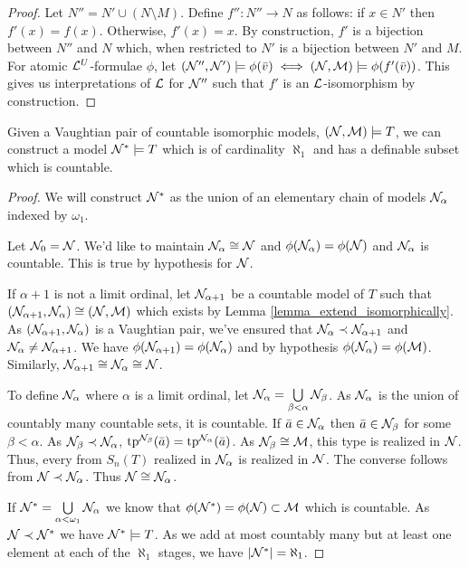 \begin{proof}
Let \(N'' = N' \cup (N \setminus M)\).
Define \(f'': N'' \to N\) as follows: if \(x \in N'\) then \(f'(x) = f(x)\). 
Otherwise, \(f'(x) = x\). 
By construction, \(f'\) is a bijection between \(N''\) and \(N\) which, when restricted to \(N'\) is a bijection between  \(N'\) and \(M\). 
For atomic \(\mathcal{L}^U\)-formulae \(\phi\), let \((\mathcal{N}'', \mathcal{N}') \models \phi(\bar{v}) \iff (\mathcal{N}, \mathcal{M}) \models \phi(f'(\bar{v}))\).
This gives us interpretations of \(\mathcal{L}\) for \(\mathcal{N}''\) such that \(f'\) is an \(\mathcal{L}\)-isomorphism by construction. 
\end{proof}

\begin{theorem}\label{theorem_aleph_one_vaughtian_pair}
Given a Vaughtian pair of countable isomorphic models, \((\mathcal{N}, \mathcal{M}) \models T\), we can construct a model \(\mathcal{N}^* \models T\) which is of cardinality \(\aleph_1\) and has a definable subset which is countable.  
\end{theorem}

\begin{proof}
We will construct \(\mathcal{N}^*\) as the union of an elementary chain of models \(\mathcal{N}_\alpha\) indexed by \(\omega_1\).

Let \(\mathcal{N}_0 = \mathcal{N}\). 
We'd like to maintain \(\mathcal{N}_\alpha \cong \mathcal{N}\) and \(\phi(\mathcal{N}_\alpha) = \phi(\mathcal{N})\) and \(\mathcal{N}_\alpha\) is countable. 
This is true by hypothesis for \(\mathcal{N}\).

If \(\alpha + 1\) is not a limit ordinal, let \(\mathcal{N}_{\alpha + 1}\) be a countable model of \(T\) such that \((\mathcal{N}_{\alpha+1}, \mathcal{N}_\alpha) \cong (\mathcal{N}, \mathcal{M})\) which exists by Lemma \ref{lemma_extend_isomorphically}. 
As \((\mathcal{N}_{\alpha+1}, \mathcal{N}_\alpha)\) is a Vaughtian pair, we've ensured that \(\mathcal{N}_\alpha \prec \mathcal{N}_{\alpha+1}\) and \(\mathcal{N}_\alpha \neq \mathcal{N}_{\alpha+1}\).
We have \(\phi(\mathcal{N}_{\alpha + 1}) = \phi(\mathcal{N}_\alpha)\) and by hypothesis \(\phi(\mathcal{N}_\alpha) = \phi(\mathcal{M})\). 
Similarly,  \(\mathcal{N}_{\alpha+1} \cong \mathcal{N}_\alpha \cong \mathcal{N}\). 

To define \(\mathcal{N}_\alpha\) where \(\alpha\) is a limit ordinal, let \(\mathcal{N}_\alpha = \bigcup\limits_{\beta < \alpha}\mathcal{N}_\beta\). 
As \(\mathcal{N}_\alpha\) is the union of countably many countable sets, it is countable. 
If \(\bar{a} \in \mathcal{N}_\alpha\) then \(\bar{a} \in \mathcal{N}_\beta\) for some \(\beta < \alpha\). 
As \(\mathcal{N}_\beta \prec \mathcal{N}_\alpha\), \(\text{tp}^{\mathcal{N}_\beta}(\bar{a}) = \text{tp}^{\mathcal{N}_\alpha}(\bar{a})\). 
As \(\mathcal{N}_\beta \cong \mathcal{M}\), this type is realized in \(\mathcal{N}\).
Thus, every from \(S_n(T)\) realized in \(\mathcal{N}_\alpha\) is realized in \(\mathcal{N}\). 
The converse follows from \(\mathcal{N} \prec \mathcal{N}_\alpha\). 
Thus \(\mathcal{N} \cong \mathcal{N}_\alpha\).

If \(\mathcal{N}^* = \bigcup\limits_{\alpha < \omega_1}\mathcal{N}_\alpha\) we know that \(\phi(\mathcal{N}^*) = \phi(\mathcal{N}) \subset \mathcal{M}\) which is countable.
As \(\mathcal{N} \prec \mathcal{N}^*\) we have \(\mathcal{N}^* \models T\).  
As we add at most countably many but at least one element at each of the \(\aleph_1\) stages, we have \(|\mathcal{N}^*| = \aleph_1\).
\end{proof}

